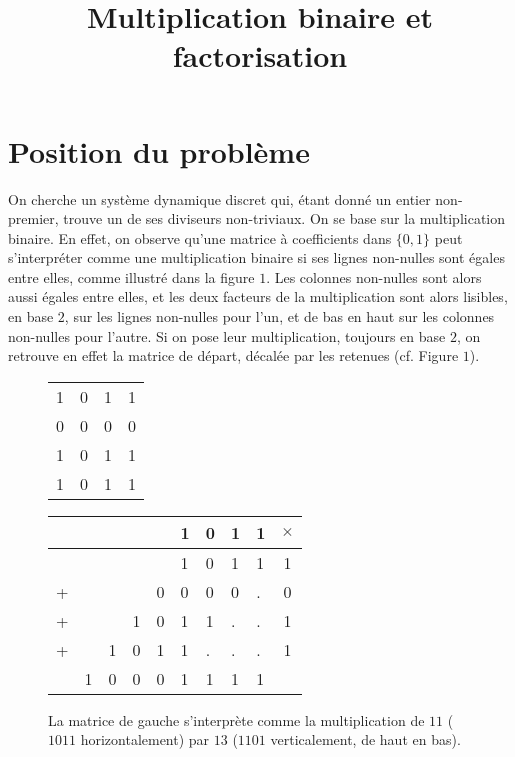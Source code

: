 \documentclass[11pt, openany]{article}
\begin{document}
\renewcommand{\labelitemi}{$\bullet$}

\title{Multiplication binaire et factorisation}
\date{}
\author{}
\maketitle



\section*{Position du problème}


On cherche un système dynamique discret qui, étant donné un entier non-premier, trouve un de ses diviseurs non-triviaux. On se base sur la multiplication binaire. En effet, on observe qu'une matrice à coefficients dans $\{0,1\}$ peut s'interpréter comme une multiplication binaire si ses lignes non-nulles sont égales entre elles, comme illustré dans la figure $1$. Les colonnes non-nulles sont alors aussi égales entre elles, et les deux facteurs de la multiplication sont alors lisibles, en base $2$, sur les lignes non-nulles pour l'un, et de bas en haut sur les colonnes non-nulles pour l'autre. Si on pose leur multiplication, toujours en base $2$, on retrouve en effet la matrice de départ, décalée par les retenues (cf. Figure $1$).



\begin{figure}[h]
\centering
\begin{minipage}[]{0.25\linewidth}

\begin{tabular}{cccc}
1&0&1&1\\
0&0&0&0\\
1&0&1&1\\
1&0&1&1\\
\end{tabular}

\end{minipage}
\quad
\begin{minipage}[]{0.4\linewidth}


\begin{tabular}{lllllllll|c}
&&&&&1&0&1&1&$\times$\\
\hline
&&&&&1&0&1&1&1\\
+&&&&0&0&0&0&.&0 \\
+&&&1&0&1&1&.&.&1\\
+&&1&0&1&1&.&.&.&1\\
\hline
&1&0&0&0&1&1&1&1&\\
\end{tabular}
\end{minipage}
\caption{La matrice de gauche s'interprète comme la multiplication de $11$ ($1011$ horizontalement) par $13$ ($1101$ verticalement, de haut en bas).}
\end{figure}
\end{document}
